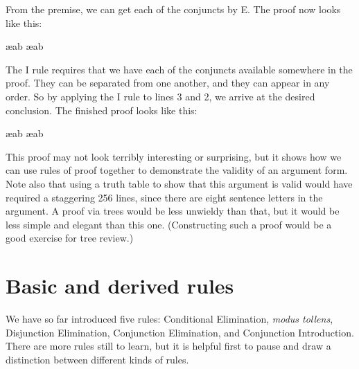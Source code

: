 \begin{ndproof}
\end{ndproof}

From the premise, we can get each of the conjuncts by {\eand}E. The proof now looks like this:

\begin{ndproof}
	 \ae{ab}
	 \ae{ab}
\end{ndproof}

The {\eand}I rule requires that we have each of the conjuncts available somewhere in the proof. They can be separated from one another, and they can appear in any order. So by applying the {\eand}I rule to lines 3 and 2, we arrive at the desired conclusion. The finished proof looks like this:

\begin{ndproof}

	 \ae{ab}
	 \ae{ab}
	 
\end{ndproof}

This proof may not look terribly interesting or surprising, but it shows how we can use rules of proof together to demonstrate the validity of an argument form. Note also that using a truth table to show that this argument is valid would have required a staggering 256 lines, since there are eight sentence letters in the argument. A proof via trees would be less unwieldy than that, but it would be less simple and elegant than this one. (Constructing such a proof would be a good exercise for tree review.)


\section{Basic and derived rules}
\label{sec:basic}

We have so far introduced five rules: Conditional Elimination, \emph{modus tollens}, Disjunction Elimination, Conjunction Elimination, and Conjunction Introduction. There are more rules still to learn, but it is helpful first to pause and draw a distinction between different kinds of rules.

